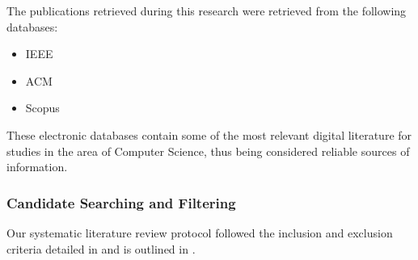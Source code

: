 The publications retrieved during this research were retrieved from the following databases:

\begin{itemize}
    \item IEEE
    \item ACM
    \item Scopus
\end{itemize}{}

These electronic databases contain some of the most relevant digital literature for studies in the area of Computer Science, thus being considered reliable sources of information. 

\subsubsection{Candidate Searching and Filtering}\label{sec:process}

Our systematic literature review protocol followed the inclusion and exclusion criteria detailed in  and is outlined in .

